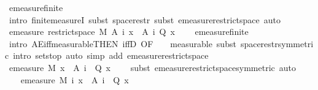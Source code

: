 \begin{isabellebody}
\ emeasure{\isacharunderscore}{\kern0pt}finite\ \isamarkupfalse%
\ {\isacharparenleft}{\kern0pt}intro\ finite{\isacharunderscore}{\kern0pt}measureI{\isacharcomma}{\kern0pt}\ subst\ space{\isacharunderscore}{\kern0pt}restr{\isacharcomma}{\kern0pt}\ subst\ emeasure{\isacharunderscore}{\kern0pt}restrict{\isacharunderscore}{\kern0pt}space{\isacharcomma}{\kern0pt}\ auto{\isacharparenright}{\kern0pt}\isanewline
\ \ \ \ \isamarkupfalse%
\ {\isachardoublequoteopen}emeasure\ {\isacharparenleft}{\kern0pt}restrict{\isacharunderscore}{\kern0pt}space\ M\ {\isacharparenleft}{\kern0pt}A\ i{\isacharparenright}{\kern0pt}{\isacharparenright}{\kern0pt}\ {\isacharbraceleft}{\kern0pt}x\ {\isasymin}\ A\ i{\isachardot}{\kern0pt}\ {\isasymnot}Q\ x{\isacharbraceright}{\kern0pt}\ {\isacharequal}{\kern0pt}\ {}{\isachardoublequoteclose}\ \isamarkupfalse%
\ emeasure{\isacharunderscore}{\kern0pt}finite\ \isamarkupfalse%
\ {\isacharparenleft}{\kern0pt}intro\ AE{\isacharunderscore}{\kern0pt}iff{\isacharunderscore}{\kern0pt}measurable{\isacharbrackleft}{\kern0pt}THEN\ iffD{}{\isacharcomma}{\kern0pt}\ OF\ {\isacharunderscore}{\kern0pt}\ {\isacharunderscore}{\kern0pt}\ {\isacharasterisk}{\kern0pt}{\isacharbrackright}{\kern0pt}{\isacharcomma}{\kern0pt}\ measurable{\isacharcomma}{\kern0pt}\ subst\ space{\isacharunderscore}{\kern0pt}restr{\isacharbrackleft}{\kern0pt}symmetric{\isacharbrackright}{\kern0pt}{\isacharcomma}{\kern0pt}\ intro\ sets{\isachardot}{\kern0pt}top{\isacharcomma}{\kern0pt}\ auto\ simp\ add{\isacharcolon}{\kern0pt}\ emeasure{\isacharunderscore}{\kern0pt}restrict{\isacharunderscore}{\kern0pt}space{\isacharparenright}{\kern0pt}\isanewline
\ \ \ \ \isamarkupfalse%
\ {\isachardoublequoteopen}emeasure\ M\ {\isacharbraceleft}{\kern0pt}x\ {\isasymin}\ A\ i{\isachardot}{\kern0pt}\ {\isasymnot}\ Q\ x{\isacharbraceright}{\kern0pt}\ {\isacharequal}{\kern0pt}\ {}{\isachardoublequoteclose}\ \isamarkupfalse%
\ {\isacharparenleft}{\kern0pt}subst\ emeasure{\isacharunderscore}{\kern0pt}restrict{\isacharunderscore}{\kern0pt}space{\isacharbrackleft}{\kern0pt}symmetric{\isacharbrackright}{\kern0pt}{\isacharcomma}{\kern0pt}\ auto{\isacharparenright}{\kern0pt}\isanewline
\ \ \isacommand{{\isacharbraceright}{\kern0pt}}\isamarkupfalse%
\isanewline
\ \ \isamarkupfalse%
\ {\isachardoublequoteopen}emeasure\ M\ {\isacharparenleft}{\kern0pt}{\isasymUnion}i{\isachardot}{\kern0pt}\ {\isacharbraceleft}{\kern0pt}x\ {\isasymin}\ A\ i{\isachardot}{\kern0pt}\ {\isasymnot}\ Q\ x{\isacharbraceright}{\kern0pt}{\isacharparenright}{\kern0pt}\ {\isacharequal}{\kern0pt}\ {}{\isachardoublequoteclose}\ \isamarkupfalse%

\end{isabellebody}
